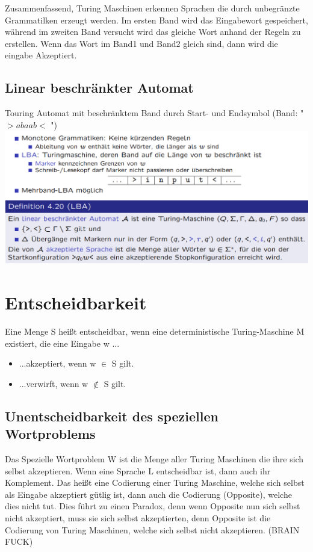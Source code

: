\documentclass[12pt,a4paper]{article}
\begin{document}
	Zusammenfassend, Turing Maschinen erkennen Sprachen die durch unbegränzte Grammatilken erzeugt werden. Im ersten Band wird das Eingabewort gespeichert, während im zweiten Band versucht wird das gleiche Wort anhand der Regeln zu erstellen. Wenn das Wort im Band1 und Band2 gleich sind, dann wird die eingabe Akzeptiert.

	\subsection{Linear beschränkter Automat}
		Touring Automat mit beschränktem Band durch Start- und Endsymbol (Band: " $>abaab<$ ")\\
		\includegraphics[width=\textwidth]{Bilder/l-b-turing.PNG}


\section{Entscheidbarkeit}
	Eine Menge S heißt entscheidbar, wenn eine deterministische Turing-Maschine M existiert, die eine Eingabe w ...
	\begin{itemize}
		\item ...akzeptiert, wenn w $\in$ S gilt.
		\item ...verwirft, wenn w $\notin$ S gilt.
	\end{itemize}

	\subsection{Unentscheidbarkeit des speziellen Wortproblems}
	
Das Spezielle Wortproblem W ist die Menge aller Turing Maschinen die ihre sich selbst akzeptieren. Wenn eine Sprache L entscheidbar ist, dann auch ihr Komplement. Das heißt eine Codierung einer Turing Maschine, welche sich selbst als Eingabe akzeptiert gütlig ist, dann auch die Codierung (Opposite), welche dies nicht tut. Dies führt zu einen Paradox, denn wenn Opposite nun sich selbst nicht akzeptiert, muss sie sich selbst akzeptierten, denn Opposite ist die Codierung von Turing Maschinen, welche sich selbst nicht akzeptieren. (BRAIN FUCK)
\end{document}
